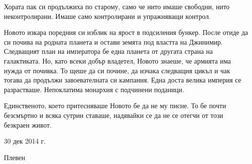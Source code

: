 \documentclass[ebook,openany,12pt]{memoir}
\begin{document}
Хората пак си продължиха по старому, само че нито имаше свободни, нито неконтролирани. Имаше само контролирани и упражняващи контрол.

Новото изкара поредния си изблик на ярост в подсиления бункер. После отиде да си почива на родната планета и остави земята под властта на Джинимир. Следващият план на императора бе една планета от другата страна на галактиката. Но, като всеки добър владетел, Новото знаеше, че армията има нужда от почивка. То щеше да си почине, да изчака следващия цикъл и чак тогава да продължи завоевателната си кампания. Една доста велика империя се разрастваше. Непоклатима монархия с подчинени поданици.

Единственото, което притесняваше Новото бе да не му писне. То бе почти безсмъртно и всяка сутрин ставаше, надявайки се да не се отегчи от този безкраен живот.

\begin{flushright}
30 дек 2014 г.

Плевен
\end{flushright}
\end{document}
